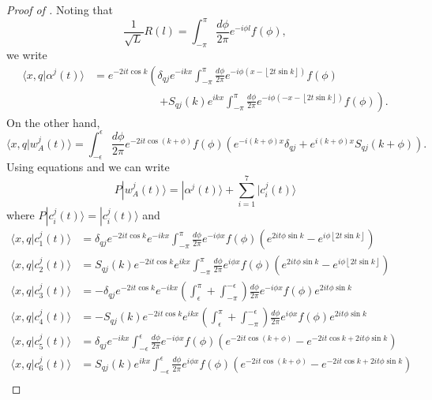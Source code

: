 \documentclass[../thesis-main/thesis-main]{subfiles}
\begin{document}
\begin{proof}[Proof of {}]
Noting that
\[
\frac{1}{\sqrt{L}}R(l)=\int_{-\pi}^{\pi}\frac{d\phi}{2\pi}e^{-i\phi l}f(\phi),
\]
we write
\begin{align}
\langle x,q|\alpha^{j}(t)\rangle & = e^{-2it\cos k}\left(\delta_{qj}e^{-ikx}\int_{-\pi}^{\pi}\frac{d\phi}{2\pi}e^{-i\phi\left(x-\left\lfloor 2t\sin k\right\rfloor \right)}f(\phi)\right.\nonumber\\
&\qquad\qquad\qquad  \left. +S_{qj}(k)e^{ikx}\int_{-\pi}^{\pi}\frac{d\phi}{2\pi}e^{-i\phi\left(-x-\left\lfloor 2t\sin k\right\rfloor \right)}f(\phi)\right).\label{eq:alpha_mat_elements}
\end{align}
On the other hand,
\begin{equation}
\langle x,q|w_{A}^{j}(t)\rangle=\int_{-\epsilon}^{\epsilon}\frac{d\phi}{2\pi}e^{-2it\cos\left(k+\phi\right)}f(\phi)\left(e^{-i\left(k+\phi\right)x}\delta_{qj}+e^{i\left(k+\phi\right)x}S_{qj}(k+\phi)\right).\label{eq:w_a_mat_elements}
\end{equation}
Using equations  and 
we can write\[
P|w_{A}^{j}(t)\rangle=|\alpha^{j}(t)\rangle+\sum_{i=1}^{7}|c_{i}^{j}(t)\rangle\]
 where $P|c_{i}^{j}(t)\rangle=|c_{i}^{j}(t)\rangle$ and \begin{align*}
\langle x,q|c_{1}^{j}(t)\rangle & = \delta_{qj}e^{-2it\cos k}e^{-ikx}\int_{-\pi}^{\pi}\frac{d\phi}{2\pi}e^{-i\phi x}f(\phi)\left(e^{2it\phi\sin k}-e^{i\phi\left\lfloor 2t\sin k\right\rfloor }\right)\\
\langle x,q|c_{2}^{j}(t)\rangle & = S_{qj}(k)e^{-2it\cos k}e^{ikx}\int_{-\pi}^{\pi}\frac{d\phi}{2\pi}e^{i\phi x}f(\phi)\left(e^{2it\phi\sin k}-e^{i\phi\left\lfloor 2t\sin k\right\rfloor }\right)\\
\langle x,q|c_{3}^{j}(t)\rangle & = -\delta_{qj}e^{-2it\cos k}e^{-ikx}\left(\int_{\epsilon}^{\pi}+\int_{-\pi}^{-\epsilon}\right)\frac{d\phi}{2\pi}e^{-i\phi x}f(\phi)e^{2it\phi\sin k}\\
\langle x,q|c_{4}^{j}(t)\rangle & = -S_{qj}(k)e^{-2it\cos k}e^{ikx}\left(\int_{\epsilon}^{\pi}+\int_{-\pi}^{-\epsilon}\right)\frac{d\phi}{2\pi}e^{i\phi x}f(\phi)e^{2it\phi\sin k}\\
\langle x,q|c_{5}^{j}(t)\rangle & = \delta_{qj}e^{-ikx}\int_{-\epsilon}^{\epsilon}\frac{d\phi}{2\pi}e^{-i\phi x}f(\phi)\left(e^{-2it\cos\left(k+\phi\right)}-e^{-2it\cos k+2it\phi\sin k}\right)\\
\langle x,q|c_{6}^{j}(t)\rangle & = S_{qj}(k)e^{ikx}\int_{-\epsilon}^{\epsilon}\frac{d\phi}{2\pi}e^{i\phi x}f(\phi)\left(e^{-2it\cos\left(k+\phi\right)}-e^{-2it\cos k+2it\phi\sin k}\right)\\

\end{align*}
\end{proof}
\end{document}
